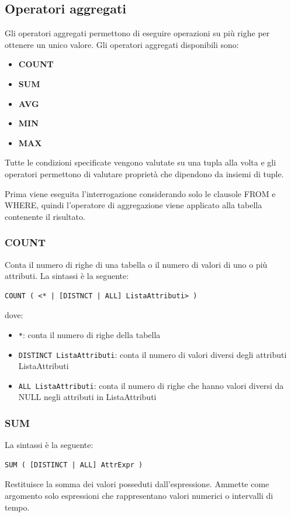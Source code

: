 \documentclass[a4paper]{article}
\begin{document}
\subsection{Operatori aggregati}
Gli operatori aggregati permettono di eseguire operazioni su più righe per ottenere un unico
valore. Gli operatori aggregati disponibili sono:
\begin{itemize}
  \item \textbf{COUNT}
  \item \textbf{SUM}
  \item \textbf{AVG}
  \item \textbf{MIN}
  \item \textbf{MAX}
\end{itemize}
Tutte le condizioni specificate vengono valutate su una tupla alla volta e gli operatori
permettono di valutare proprietà che dipendono da insiemi di tuple.

Prima viene eseguita l’interrogazione considerando solo le clausole
FROM e WHERE, quindi l’operatore di aggregazione viene applicato alla
tabella contenente il risultato.

\subsubsection{COUNT}
Conta il numero di righe di una tabella o il numero di valori di uno o più attributi.
La sintassi è la seguente:
\begin{lstlisting}
COUNT ( <* | [DISTNCT | ALL] ListaAttributi> )
\end{lstlisting}
dove:
\begin{itemize}
  \item \texttt{*}: conta il numero di righe della tabella

  \item \texttt{DISTINCT ListaAttributi}: conta il numero di valori diversi degli
    attributi ListaAttributi

  \item \texttt{ALL ListaAttributi}: conta il numero di righe che hanno valori diversi da
    NULL negli attributi in ListaAttributi
\end{itemize}

\subsubsection{SUM}
La sintassi è la seguente:
\begin{lstlisting}
SUM ( [DISTINCT | ALL] AttrExpr )
\end{lstlisting}
Restituisce la somma dei valori posseduti dall'espressione.
Ammette come argomento solo espressioni che rappresentano valori numerici o intervalli
di tempo.
\end{document}
